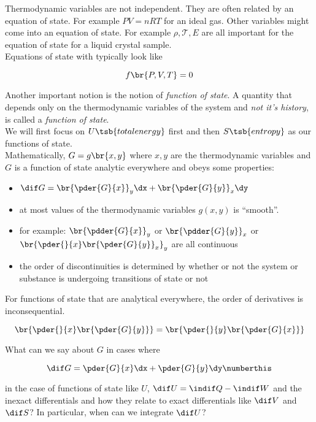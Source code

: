 \documentclass{article}
\begin{document}
Thermodynamic variables are not independent. They are often related by an equation of state. For example $PV = nRT$ for an ideal gas. Other variables might come into an equation of state. For example $\rho, \mathcal{T}, E$ are all important for the equation of state for a liquid crystal sample. \\

Equations of state with typically look like

\[ f\br{P, V, T} = 0 \]

Another important notion is the notion of \textit{function of state}. A quantity that depends only on the thermodynamic variables of the system and \textit{not it's history}, is called a \textit{function of state}. \\

We will first focus on $U\tsb{total energy}$ first and then $S\tsb{entropy}$ as our functions of state. \\

Mathematically, $G = g\br{x,y}$ where $x,y$ are the thermodynamic variables and $G$ is a function of state analytic everywhere and obeys some properties:

\begin{itemize}
    \item $\dif G = \br{\pder{G}{x}}_y \dx + \br{\pder{G}{y}}_x \dy $
    \item at most values of the thermodynamic variables $g(x,y)$ is ``smooth''.
    \item for example: $\br{\pdder{G}{x}}_y$ or $\br{\pdder{G}{y}}_x$ or $\br{\pder{}{x}\br{\pder{G}{y}}_x}_y$ are all continuous
    \item the order of discontinuities is determined by whether or not the system or substance is undergoing transitions of state or not
\end{itemize}

For functions of state that are analytical everywhere, the order of derivatives is inconsequential.

\[ \br{\pder{}{x}\br{\pder{G}{y}}} = \br{\pder{}{y}\br{\pder{G}{x}}}\]

What can we say about $G$ in cases where

\[ \dif G = \pder{G}{x} \dx + \pder{G}{y} \dy \numberthis \label{eq:dg} \]

in the case of functions of state like $U$, $ \dif U = \indif Q - \indif W  $ and the inexact differentials and how they relate to exact differentials like $\dif V$ and $\dif S$? In particular, when can we integrate $\dif U$?
\end{document}
